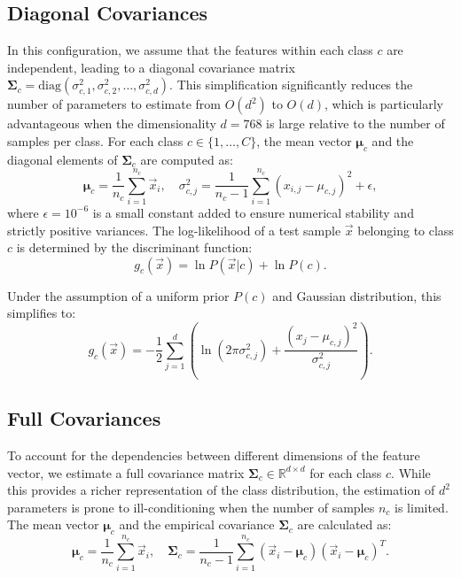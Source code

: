 \subsection{Diagonal Covariances}
In this configuration, we assume that the features within each class $c$ are independent, leading to a diagonal covariance matrix $\boldsymbol{\Sigma}_c = \text{diag}(\sigma_{c,1}^2, \sigma_{c,2}^2, \dots, \sigma_{c,d}^2)$. This simplification significantly reduces the number of parameters to estimate from $O(d^2)$ to $O(d)$, which is particularly advantageous when the dimensionality $d = 768$ is large relative to the number of samples per class. For each class $c \in \{1, \dots, C\}$, the mean vector $\boldsymbol{\mu}_c$ and the diagonal elements of $\boldsymbol{\Sigma}_c$ are computed as:
\begin{equation}
	\boldsymbol{\mu}_c = \frac{1}{n_c} \sum_{i=1}^{n_c} \vec{x}_i, \quad \sigma_{c,j}^2 = \frac{1}{n_c-1} \sum_{i=1}^{n_c} (x_{i,j} - \mu_{c,j})^2 + \epsilon,
\end{equation}
where $\epsilon = 10^{-6}$ is a small constant added to ensure numerical stability and strictly positive variances. The log-likelihood of a test sample $\vec{x}$ belonging to class $c$ is determined by the discriminant function:
\begin{equation}
	g_c(\vec{x}) = \ln P(\vec{x}|c) + \ln P(c).
\end{equation}

Under the assumption of a uniform prior $P(c)$ and Gaussian distribution, this simplifies to:
\begin{equation}
	g_c(\vec{x}) = -\frac{1}{2} \sum_{j=1}^{d} \left( \ln(2\pi\sigma_{c,j}^2) + \frac{(x_j - \mu_{c,j})^2}{\sigma_{c,j}^2} \right).
\end{equation}


\subsection{Full Covariances}
\label{sec:method:full_cov}

To account for the dependencies between different dimensions of the feature vector, we estimate a full covariance matrix $\boldsymbol{\Sigma}_c \in \mathbb{R}^{d \times d}$ for each class $c$. While this provides a richer representation of the class distribution, the estimation of $d^2$ parameters is prone to ill-conditioning when the number of samples $n_c$ is limited. The mean vector $\boldsymbol{\mu}_c$ and the empirical covariance $\boldsymbol{\Sigma}_c$ are calculated as:
\begin{equation}
	\boldsymbol{\mu}_c = \frac{1}{n_c} \sum_{i=1}^{n_c} \vec{x}_i, \quad \boldsymbol{\Sigma}_c = \frac{1}{n_c - 1} \sum_{i=1}^{n_c} (\vec{x}_i - \boldsymbol{\mu}_c)(\vec{x}_i - \boldsymbol{\mu}_c)^T.
\end{equation}

